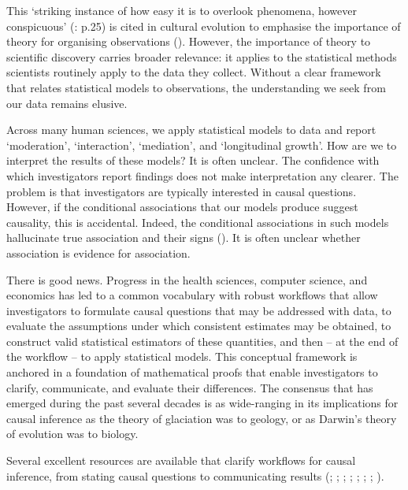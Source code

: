 \documentclass[
  single column]{article}
\begin{document}
This `striking instance of how easy it is to overlook phenomena, however
conspicuous' (: p.25) is cited
in cultural evolution to emphasise the importance of theory for
organising observations (). However, the importance of theory to scientific discovery
carries broader relevance: it applies to the statistical methods
scientists routinely apply to the data they collect. Without a clear
framework that relates statistical models to observations, the
understanding we seek from our data remains elusive.

Across many human sciences, we apply statistical models to data and
report `moderation', `interaction', `mediation', and `longitudinal
growth'. How are we to interpret the results of these models? It is
often unclear. The confidence with which investigators report findings
does not make interpretation any clearer. The problem is that
investigators are typically interested in causal questions. However, if
the conditional associations that our models produce suggest causality,
this is accidental. Indeed, the conditional associations in such models
hallucinate true association and their signs
(). It is
often unclear whether association is evidence for association.

There is good news. Progress in the health sciences, computer science,
and economics has led to a common vocabulary with robust workflows that
allow investigators to formulate causal questions that may be addressed
with data, to evaluate the assumptions under which consistent estimates
may be obtained, to construct valid statistical estimators of these
quantities, and then -- at the end of the workflow -- to apply
statistical models. This conceptual framework is anchored in a
foundation of mathematical proofs that enable investigators to clarify,
communicate, and evaluate their differences. The consensus that has
emerged during the past several decades is as wide-ranging in its
implications for causal inference as the theory of glaciation was to
geology, or as Darwin's theory of evolution was to biology.

Several excellent resources are available that clarify workflows for
causal inference, from stating causal questions to communicating results
(;
;
;
;
;
; ; ).
\end{document}
